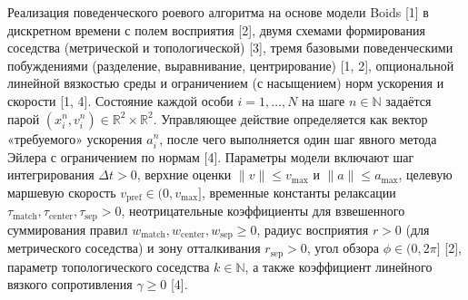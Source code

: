 \documentclass{article}
\begin{document}
Реализация поведенческого роевого алгоритма на основе модели Boids [1] в дискретном времени с полем восприятия [2], двумя схемами формирования соседства (метрической и топологической) [3], тремя базовыми поведенческими побуждениями (разделение, выравнивание, центрирование) [1, 2], опциональной линейной вязкостью среды и ограничением (с насыщением) норм ускорения и скорости [1, 4]. Состояние каждой особи $i=1,\dots,N$ на шаге $n\in\mathbb{N}$ задаётся парой $(x_i^n,v_i^n)\in\mathbb{R}^2\times\mathbb{R}^2$. Управляющее действие определяется как вектор «требуемого» ускорения $a_i^n$, после чего выполняется один шаг явного метода Эйлера с ограничением по нормам [4]. Параметры модели включают шаг интегрирования $\Delta t>0$, верхние оценки $\|v\|\le v_{\max}$ и $\|a\|\le a_{\max}$, целевую маршевую скорость $v_{\mathrm{pref}}\in(0,v_{\max}]$, временные константы релаксации $\tau_{\mathrm{match}},\tau_{\mathrm{center}},\tau_{\mathrm{sep}}>0$, неотрицательные коэффициенты для взвешенного суммирования правил $w_{\mathrm{match}},w_{\mathrm{center}},w_{\mathrm{sep}}\ge 0$, радиус восприятия $r>0$ (для метрического соседства) и зону отталкивания $r_{\mathrm{sep}}>0$, угол обзора $\phi\in(0,2\pi]$ [2], параметр топологического соседства $k\in\mathbb{N}$, а также коэффициент линейного вязкого сопротивления $\gamma\ge0$ [4].
\end{document}
